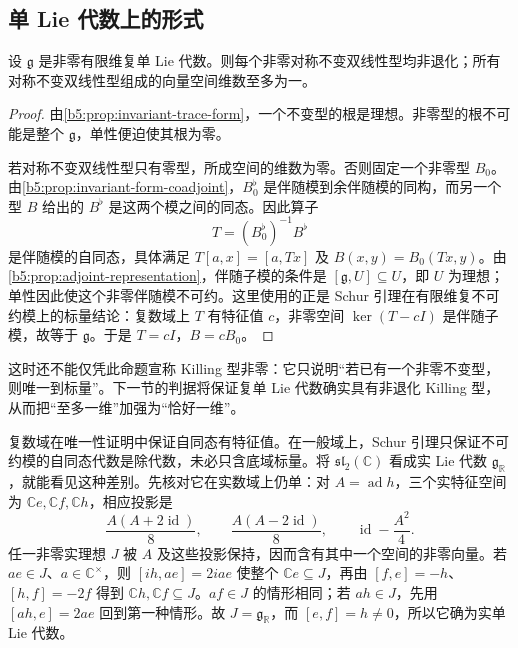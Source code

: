 \subsection{单 Lie 代数上的形式}
\label{b5:subsec:1301:03}

\begin{proposition}\label{b5:prop:simple-invariant-form-unique}
	设 \(\mathfrak g\) 是非零有限维复单 Lie 代数。则每个非零对称不变双线性型均非退化；所有对称不变双线性型组成的向量空间维数至多为一。
\end{proposition}
\begin{proof}
	由\cref{b5:prop:invariant-trace-form}，一个不变型的根是理想。非零型的根不可能是整个 \(\mathfrak g\)，单性便迫使其根为零。

	若对称不变双线性型只有零型，所成空间的维数为零。否则固定一个非零型 \(B_0\)。由\cref{b5:prop:invariant-form-coadjoint}，\(B_0^\flat\) 是伴随模到余伴随模的同构，而另一个型 \(B\) 给出的 \(B^\flat\) 是这两个模之间的同态。因此算子
	\[
		T=(B_0^\flat)^{-1}B^\flat
	\]
	是伴随模的自同态，具体满足 \(T[a,x]=[a,Tx]\) 及 \(B(x,y)=B_0(Tx,y)\)。由\cref{b5:prop:adjoint-representation}，伴随子模的条件是 \([\mathfrak g,U]\subseteq U\)，即 \(U\) 为理想；单性因此使这个非零伴随模不可约。这里使用的正是 Schur 引理在有限维复不可约模上的标量结论：复数域上 \(T\) 有特征值 \(c\)，非零空间 \(\ker(T-cI)\) 是伴随子模，故等于 \(\mathfrak g\)。于是 \(T=cI\)，\(B=cB_0\)。
\end{proof}

这时还不能仅凭此命题宣称 Killing 型非零：它只说明“若已有一个非零不变型，则唯一到标量”。下一节的判据将保证复单 Lie 代数确实具有非退化 Killing 型，从而把“至多一维”加强为“恰好一维”。

\ProseParagraphBreak

复数域在唯一性证明中保证自同态有特征值。在一般域上，Schur 引理只保证不可约模的自同态代数是除代数，未必只含底域标量。将 \(\mathfrak{sl}_2(\mathbb C)\) 看成实 Lie 代数 \(\mathfrak g_{\mathbb R}\)，就能看见这种差别。先核对它在实数域上仍单：对 \(A=\operatorname{ad}h\)，三个实特征空间为 \(\mathbb Ce,\mathbb Cf,\mathbb Ch\)，相应投影是
\[
	\dfrac{A(A+2\operatorname{id})}{8},\qquad \dfrac{A(A-2\operatorname{id})}{8},\qquad \operatorname{id}-\dfrac{A^2}{4}.
\]
任一非零实理想 \(J\) 被 \(A\) 及这些投影保持，因而含有其中一个空间的非零向量。若 \(ae\in J\)、\(a\in\mathbb C^\times\)，则 \([ih,ae]=2iae\) 使整个 \(\mathbb Ce\subseteq J\)，再由 \([f,e]=-h\)、\([h,f]=-2f\) 得到 \(\mathbb Ch,\mathbb Cf\subseteq J\)。\(af\in J\) 的情形相同；若 \(ah\in J\)，先用 \([ah,e]=2ae\) 回到第一种情形。故 \(J=\mathfrak g_{\mathbb R}\)，而 \([e,f]=h\ne0\)，所以它确为实单 Lie 代数。


